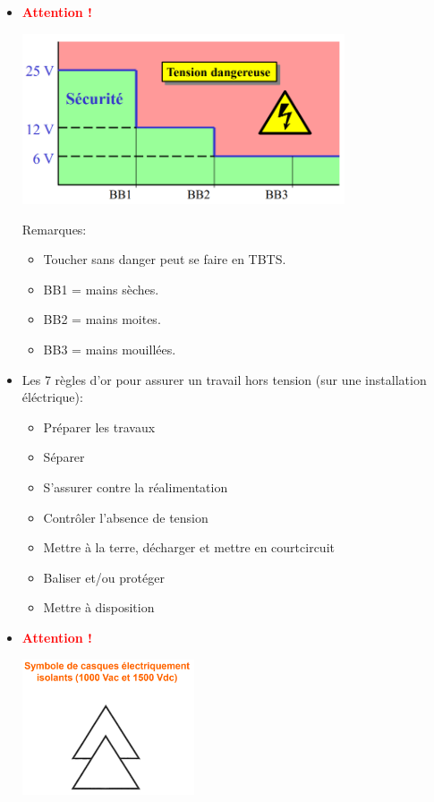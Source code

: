 \documentclass[a4paper]{article}
\begin{document}
\begin{itemize}
\item \textcolor{red}{\textbf{Attention !}}
\begin{center}
\includegraphics[width=0.75\textwidth]{images/elec04.PNG}
\end{center}
Remarques:
\begin{itemize}
    \item Toucher sans danger peut se faire en TBTS.
    \item BB1 = mains sèches.
    \item BB2 = mains moites.
    \item BB3 = mains mouillées.
\end{itemize}





\item Les 7 règles d’or pour assurer un travail hors tension (sur une installation éléctrique):
\begin{itemize}
    \item Préparer les travaux
    \item Séparer
    \item S’assurer contre la réalimentation
    \item Contrôler l’absence de tension
    \item Mettre à la terre, décharger et mettre en courtcircuit
    \item Baliser et/ou protéger
    \item Mettre à disposition
\end{itemize}





\item \textcolor{red}{\textbf{Attention !}}
\begin{center}
\includegraphics[width=0.4\textwidth]{images/elec05.PNG}
\end{center}






\end{itemize}
\end{document}
